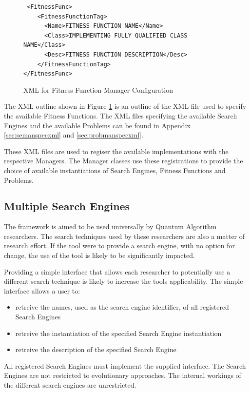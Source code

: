 \documentclass[authoryearcitations]{UoYCSproject}
\begin{document}
\lstset{language=XML}
\begin{figure}
\begin{lstlisting}
 <FitnessFunc>
	<FitnessFunctionTag>
	  <Name>FITNESS FUNCTION NAME</Name>
	  <Class>IMPLEMENTING FULLY QUALIFIED CLASS NAME</Class>
	  <Desc>FITNESS FUNCTION DESCRIPTION</Desc>
	</FitnessFunctionTag>
</FitnessFunc>
\end{lstlisting}
\caption{XML for Fitness Function Manager Configuration}
\label{code:fitfuntmanconfig}
\end{figure}

The XML outline shown in Figure \ref{code:fitfuntmanconfig} is an outline of the XML file used to specify the available Fitness Functions.
The XML files specifying the available Search Engines and the available Problems can be found in Appendix \ref{sec:semanspecxml} and \ref{sec:probmanspecxml}.

These XML files are used to regiser the available implementations with the respective Managers.
The Manager classes use these registrations to provide the choice of available instantiations of Search Engines, Fitness Functions and Problems.

\subsection{Multiple Search Engines}
The framework is aimed to be used universally by Quantum Algorithm researchers.
The search techniques used by these researchers are also a matter of research effort.
If the tool were to provide a search engine, with no option for change, the use of the tool is likely to be significantly impacted.

Providing a simple interface that allows each researcher to potentially use a different search technique is likely to increase the tools applicability.
The simple interface allows a user to:
\begin{itemize}
 \item retreive the names, used as the search engine identifier, of all registered Search Engines
 \item retreive the instantiation of the specified Search Engine instantiation
 \item retreive the description of the specified Search Engine
\end{itemize}

All registered Search Engines must implement the supplied interface.
The Search Engines are not restricted to evolutionary approaches.
The internal workings of the different search engines are unrestricted.
\end{document}
